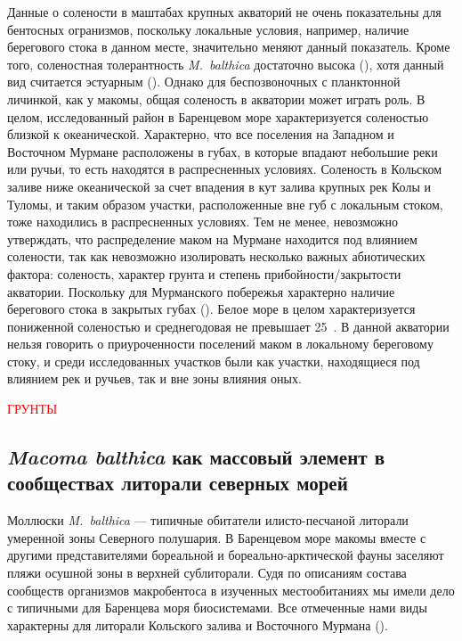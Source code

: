 Данные о солености в маштабах крупных акваторий не очень показательны для бентосных огранизмов, поскольку локальные условия, например, наличие берегового стока в данном месте, значительно меняют данный показатель. 
Кроме того, соленостная толерантность {\it M.~balthica} достаточно высока (\cite{***}), хотя данный вид считается эстуарным (\cite{***}). 
Однако для беспозвоночных с планктонной личинкой, как у макомы, общая соленость в акватории может играть роль.
В целом, исследованный район в Баренцевом море характеризуется соленостью близкой к океанической.
Характерно, что все поселения на Западном и Восточном Мурмане расположены в губах, в которые впадают небольшие реки или ручьи, то есть находятся в распресненных условиях.
Соленость в Кольском заливе ниже океанической за счет впадения в кут залива крупных рек Колы и Туломы, и таким образом участки, расположенные вне губ с локальным стоком, тоже находились в распресненных условиях.
Тем не менее, невозможно утверждать, что распределение маком на Мурмане находится под влиянием солености, так как невозможно изолировать несколько важных абиотических фактора: соленость, характер грунта и степень прибойности/закрытости акватории. 
Поскольку для Мурманского побережья характерно наличие берегового стока в закрытых губах (\cite{Guryanova_Ushakov_1929, Guryanova_et_al_1930}).
Белое море в целом характеризуется пониженной соленостью и среднегодовая не превышает 25~\permil.
В данной акватории нельзя говорить о приуроченности поселений маком в локальному береговому стоку, и среди исследованных участков были как участки, находящиеся под влиянием рек и ручьев, так и вне зоны влияния оных.

\textcolor{red}{ГРУНТЫ}

		\subsection{{\it Macoma balthica} как массовый элемент в сообществах литорали северных морей}

Моллюски {\it M.~balthica} --- типичные обитатели илисто-песчаной литорали умеренной зоны Северного полушария. 
В Баренцевом море макомы вместе с другими представителями бореальной и бореально-арктической фауны заселяют пляжи осушной зоны в верхней сублиторали. 
Судя по описаниям состава сообществ организмов макробентоса в изученных местообитаниях мы имели дело с типичными для Баренцева моря биосистемами. 
Все отмеченные нами виды характерны для литорали Кольского залива и Восточного Мурмана (\cite{Derugin_1915, Guryanova_Ushakov_1929}).



